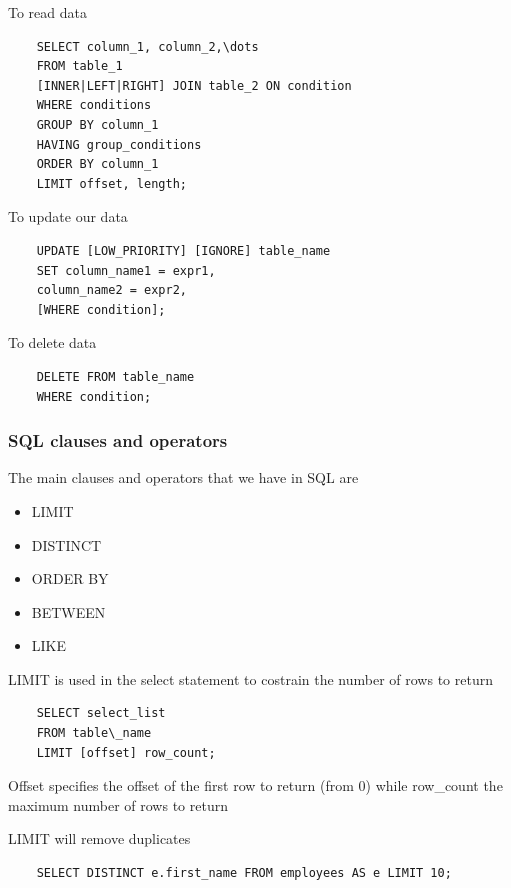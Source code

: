 To read data

\begin{verbatim}
    SELECT column_1, column_2,\dots
    FROM table_1
    [INNER|LEFT|RIGHT] JOIN table_2 ON condition
    WHERE conditions
    GROUP BY column_1
    HAVING group_conditions
    ORDER BY column_1
    LIMIT offset, length;
\end{verbatim}

To update our data

\begin{verbatim}
    UPDATE [LOW_PRIORITY] [IGNORE] table_name
    SET column_name1 = expr1,
    column_name2 = expr2,
    [WHERE condition];
\end{verbatim}

To delete data

\begin{verbatim}
    DELETE FROM table_name
    WHERE condition;
\end{verbatim}


\subsubsection{SQL clauses and operators}

The main clauses and operators that we have in SQL are

\begin{itemize}
    \item LIMIT
    \item DISTINCT
    \item ORDER BY
    \item BETWEEN
    \item [NOT] LIKE
\end{itemize}

\vspace{10pt}

LIMIT is used in the select statement to costrain the number of rows to return

\begin{verbatim}
    SELECT select_list
    FROM table\_name
    LIMIT [offset] row_count;
\end{verbatim}

Offset specifies the offset of the first row to return (from 0) while row\_count the maximum number of rows to return

\vspace{10pt}

LIMIT will remove duplicates

\begin{verbatim}
    SELECT DISTINCT e.first_name FROM employees AS e LIMIT 10;
\end{verbatim}

